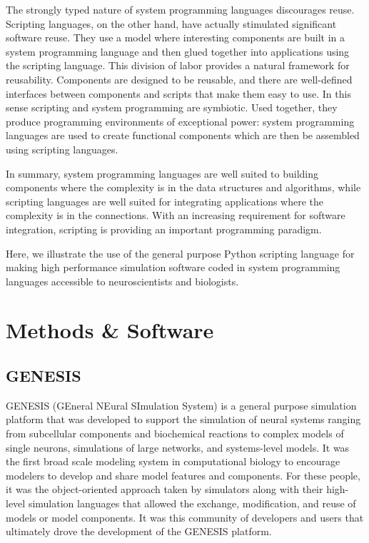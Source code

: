 \documentclass[12pt]{article}
\begin{document}
The strongly typed nature of system programming languages discourages
reuse. Scripting languages, on the other hand, have actually
stimulated significant software reuse. They use a model where
interesting components are built in a system programming language and
then glued together into applications using the scripting language.
This division of labor provides a natural framework for reusability.
Components are designed to be reusable, and there are well-defined
interfaces between components and scripts that make them easy to use.
In this sense scripting and system programming are symbiotic. Used
together, they produce programming environments of exceptional power:
system programming languages are used to create functional components
which are then be assembled using scripting languages.

In summary, system programming languages are well suited to building
components where the complexity is in the data structures and
algorithms, while scripting languages are well suited for integrating
applications where the complexity is in the connections. With an
increasing requirement for software integration, scripting is
providing an important programming paradigm.

Here, we illustrate the use of the general purpose Python scripting
language for making high performance simulation software coded in
system programming languages accessible to neuroscientists and
biologists.




\section{Methods \& Software}

\subsection{GENESIS}

GENESIS (GEneral NEural SImulation System) is a general purpose
simulation platform that was developed to support the simulation of
neural systems ranging from subcellular components and biochemical
reactions to complex models of single neurons, simulations of large
networks, and systems-level models. It was the first broad scale
modeling system in computational biology to encourage modelers to
develop and share model features and components. For these people, it
was the object-oriented approach taken by simulators along with their
high-level simulation languages that allowed the exchange,
modification, and reuse of models or model components. It was this
community of developers and users that ultimately drove the
development of the GENESIS platform.
\end{document}
